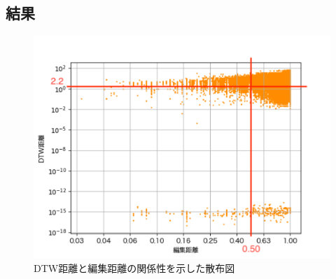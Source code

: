 \documentclass[T,J]{fose} %
\begin{document}

\subsection{結果}\label{subsec:result}

\begin{figure}[t]
	\centering
	\includegraphics[width=1.0\linewidth]{Okamoto_fig/out-all-nolimit.pdf}
	\caption{DTW距離と編集距離の関係性を示した散布図}
	\label{fig:out-nolimit}
\end{figure}
\end{document}
